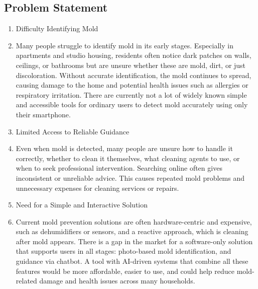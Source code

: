 \documentclass[conference]{IEEEtran}
\begin{document}
\subsection{Problem Statement}
\begin{enumerate}
\item Difficulty Identifying Mold 
\item[] Many people struggle to identify mold in its early stages. Especially in apartments and studio housing, residents often notice dark patches on walls, ceilings, or bathrooms but are unsure whether these are mold, dirt, or just discoloration. Without accurate identification, the mold continues to spread, causing damage to the home and potential health issues such as allergies or respiratory irritation. There are currently not a lot of widely known simple and accessible tools for ordinary users to detect mold accurately using only their smartphone. \\
\item Limited Access to Reliable Guidance  
\item[] Even when mold is detected, many people are unsure how to handle it correctly, whether to clean it themselves, what cleaning agents to use, or when to seek professional intervention. Searching online often gives inconsistent or unreliable advice. This causes repeated mold problems and unnecessary expenses for cleaning services or repairs. \\
\item Need for a Simple and Interactive Solution 
\item[] Current mold prevention solutions are often hardware-centric and expensive, such as dehumidifiers or sensors, and a reactive approach, which is cleaning after mold appears. There is a gap in the market for a software-only solution that supports users in all stages: photo-based mold identification, and guidance via chatbot. A tool with AI-driven systems that combine all these features would be more affordable, easier to use, and could help reduce mold-related damage and health issues across many households. 
\end{enumerate}
\end{document}
